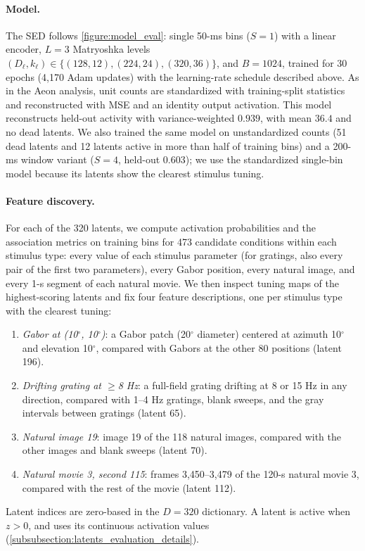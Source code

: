 \paragraph{Model.}
The SED follows \autoref{figure:model_eval}: single 50-ms bins ($S=1$) with a linear encoder, $L=3$ Matryoshka levels $(D_\ell,k_\ell)\in\{(128,12),(224,24),(320,36)\}$, and $B=1024$, trained for 30 epochs (4,170 Adam updates) with the learning-rate schedule described above. As in the Aeon analysis, unit counts are standardized with training-split statistics and reconstructed with MSE and an identity output activation. This model reconstructs held-out activity with variance-weighted  $0.939$, with mean  $36.4$ and no dead latents. We also trained the same model on unstandardized counts (51 dead latents and 12 latents active in more than half of training bins) and a 200-ms window variant ($S=4$, held-out  $0.603$); we use the standardized single-bin model because its latents show the clearest stimulus tuning.

\paragraph{Feature discovery.}
For each of the 320 latents, we compute activation probabilities and the association metrics on training bins for 473 candidate conditions within each stimulus type: every value of each stimulus parameter (for gratings, also every pair of the first two parameters), every Gabor position, every natural image, and every 1-s segment of each natural movie. We then inspect tuning maps of the highest-scoring latents and fix four feature descriptions, one per stimulus type with the clearest tuning:
\begin{enumerate}[leftmargin=*,itemsep=2pt]
    \item \textit{Gabor at (10$^\circ$, 10$^\circ$)}: a Gabor patch (20$^\circ$ diameter) centered at azimuth 10$^\circ$ and elevation 10$^\circ$, compared with Gabors at the other 80 positions (latent 196).
    \item \textit{Drifting grating at $\geq$8 Hz}: a full-field grating drifting at 8 or 15 Hz in any direction, compared with 1--4 Hz gratings, blank sweeps, and the gray intervals between gratings (latent 65).
    \item \textit{Natural image 19}: image 19 of the 118 natural images, compared with the other images and blank sweeps (latent 70).
    \item \textit{Natural movie 3, second 115}: frames 3,450--3,479 of the 120-s natural movie 3, compared with the rest of the movie (latent 112).
\end{enumerate}
Latent indices are zero-based in the $D=320$ dictionary. A latent is active when $z>0$, and  uses its continuous activation values (\hyperref[subsubsection:latents_evaluation_details]{\ref*{subsubsection:latents_evaluation_details}}).

